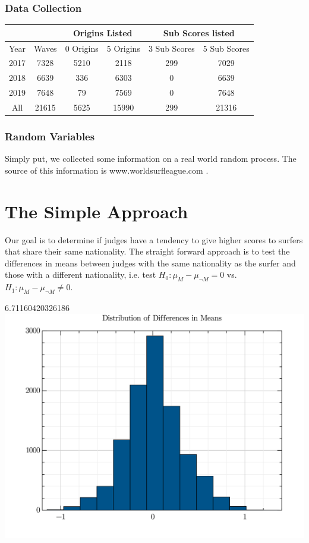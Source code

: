 \documentclass{article}
\theoremstyle{definition}
\begin{document}
\subsubsection{Data Collection}
\begin{center}
\begin{tabular}{|c|c|c|c|c|c| }
\multicolumn{2}{c}{} & \multicolumn{2}{c}{Origins Listed} & \multicolumn{2}{c}{Sub Scores listed} \\
\hline
Year & Waves & 0 Origins & 5 Origins & 3 Sub Scores & 5 Sub Scores \\ 
\hline
2017 & 7328 & 5210 & 2118  & 299 & 7029  \\
2018 & 6639 & 336 & 6303  & 0 & 6639  \\
2019 & 7648 & 79 & 7569  & 0 & 7648 \\
\hline
All & 21615 & 5625 & 15990 & 299 & 21316 \\
\hline
\end{tabular}
\end{center}

\subsubsection{Random Variables}
Simply put, we collected some information on a real world random process. The source of this information is www.worldsurfleague.com .

\section{The Simple Approach}
Our goal is to determine if judges have a tendency to give higher scores to surfers that share their same nationality.
The straight forward approach is to test the differences in means between judges with the same nationality as the surfer and those with a different nationality, i.e. test $H_0: \mu_M  - \mu_{\neg M} = 0$ vs. $H_1: \mu_M -\mu_{\neg M} \neq 0$.


6.71160420326186
\includegraphics[width=\textwidth]{./src/visuals/DistOfDiffInMeans.png}
\end{document}
